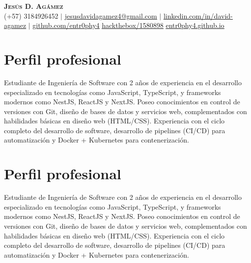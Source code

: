 \documentclass[letterpaper,11pt]{article}
\begin{document}
\begin{center}
    \textbf{\Huge \scshape Jesús D. Agámez} \\ \vspace{1pt}
    \small (+57) 3184926452 $|$ \href{mailto:jesusdavidagamez4@gmail.com}{\underline{jesusdavidagamez4@gmail.com}} $|$
    \href{https://linkedin.com/in/david-agamez}{\underline{linkedin.com/in/david-agamez}} $|$
    \href{https://github.com/entr0phy4}{\underline{github.com/entr0phy4}}
    \href{https://app.hackthebox.com/profile/1580898}{\underline{hackthebox/1580898}}
    \href{https://entr0phy4.github.io}{\underline{entr0phy4.github.io}}
\end{center}

\section{Perfil profesional}
    \par
    {Estudiante de Ingeniería de Software con 2 años de experiencia en el desarrollo especializado en tecnologías como JavaScript, TypeScript, y frameworks modernos como NestJS, ReactJS y NextJS. Poseo conocimientos en control de versiones con Git, diseño de bases de datos y servicios web, complementados con habilidades básicas en diseño web (HTML/CSS). Experiencia con el ciclo completo del desarrollo de software, desarrollo de pipelines (CI/CD) para automatización y Docker + Kubernetes para contenerización.}

\section{Perfil profesional}
        \par
        {Estudiante de Ingeniería de Software con 2 años de experiencia en el desarrollo especializado en tecnologías como JavaScript, TypeScript, y frameworks modernos como NestJS, ReactJS y NextJS. Poseo conocimientos en control de versiones con Git, diseño de bases de datos y servicios web, complementados con habilidades básicas en diseño web (HTML/CSS). Experiencia con el ciclo completo del desarrollo de software, desarrollo de pipelines (CI/CD) para automatización y Docker + Kubernetes para contenerización.}
\end{document}
